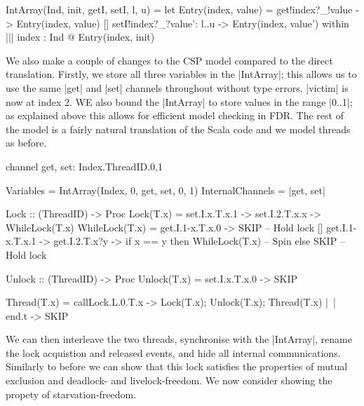 \begin{cspm}
IntArray(Ind, init, getI, setI, l, u) = 
  let Entry(index, value) = 
            get!index?_!value -> Entry(index, value)
        [] setI!index?_?value': {l..u} -> Entry(index, value')
  within ||| index : Ind @ Entry(index, init)
\end{cspm}

We also make a couple of changes to the CSP model compared to the direct translation. Firstly, we store all three variables in the |IntArray|; this allows us to use the same |get| and |set| channels throughout without type errors. |victim| is now at index 2. WE also bound the |IntArray| to store values in the range |{0..1}|; as explained above this allows for efficient model checking in FDR. The rest of the model is a fairly natural translation of the Scala code and we model threads as before.

\begin{cspm}[caption={The CSP implementation of the Peterson Lock}]
channel get, set: Index.ThreadID.{0,1}

Variables = IntArray(Index, 0, get, set, 0, 1)
InternalChannels = {|get, set|}

Lock :: (ThreadID) -> Proc
Lock(T.x) =  set.I.x.T.x.1 -> set.I.2.T.x.x -> WhileLock(T.x)
WhileLock(T.x) = 
    get.I.1-x.T.x.0 -> SKIP -- Hold lock
[] get.I.1-x.T.x.1 ->  get.I.2.T.x?y ->
                          if x == y then WhileLock(T.x) -- Spin
                          else SKIP -- Hold lock

Unlock :: (ThreadID) -> Proc
Unlock(T.x) = set.I.x.T.x.0 -> SKIP

Thread(T.x) =     callLock.L.0.T.x -> Lock(T.x); Unlock(T.x); Thread(T.x)
              |~| end.t -> SKIP
\end{cspm}

We can then interleave the two threads, synchronise with the |IntArray|, rename the lock acquistion and released events, and hide all internal communications. Similarly to before we can show that this lock satisfies the properties of mutual exclusion and deadlock- and livelock-freedom. We now consider showing the propety of starvation-freedom.




